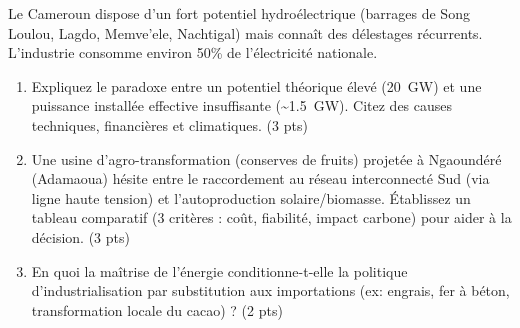 \documentclass[11pt]{article}
\begin{document}
\begin{exercice}
Le Cameroun dispose d'un fort potentiel hydroélectrique (barrages de Song Loulou, Lagdo, Memve'ele, Nachtigal) mais connaît des délestages récurrents. L'industrie consomme environ 50\% de l'électricité nationale.

\begin{enumerate}
    \item Expliquez le paradoxe entre un potentiel théorique élevé (\SI{20}{GW}) et une puissance installée effective insuffisante (\textasciitilde \SI{1,5}{GW}). Citez des causes techniques, financières et climatiques. (3 pts)
    \item Une usine d'agro-transformation (conserves de fruits) projetée à Ngaoundéré (Adamaoua) hésite entre le raccordement au réseau interconnecté Sud (via ligne haute tension) et l'autoproduction solaire/biomasse. Établissez un tableau comparatif (3 critères : coût, fiabilité, impact carbone) pour aider à la décision. (3 pts)
    \item En quoi la maîtrise de l'énergie conditionne-t-elle la politique d'industrialisation par substitution aux importations (ex: engrais, fer à béton, transformation locale du cacao) ? (2 pts)
\end{enumerate}
\end{exercice}
\end{document}
